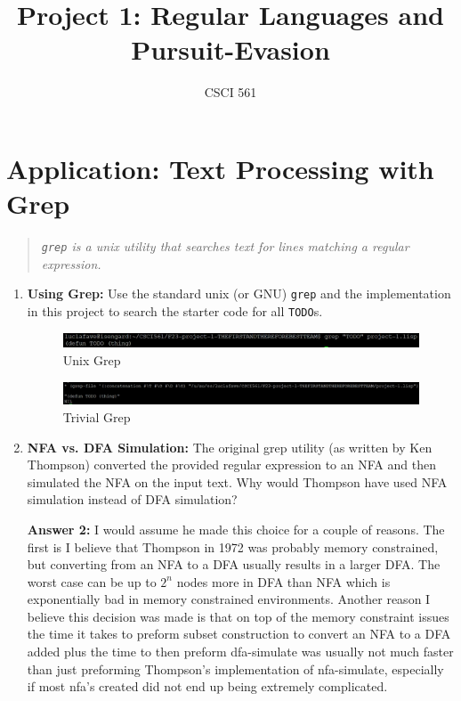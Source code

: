 \documentclass[12pt,letterpaper]{ntdhw}
\title{Project 1: Regular Languages and Pursuit-Evasion}
\author{CSCI 561}
\begin{document}
\pagestyle{fancyplain}

\maketitle
\thispagestyle{fancyplain}



\section*{Application: Text Processing with Grep}

\begin{quote}
  \emph{\texttt{grep} is a unix utility that searches text for lines
    matching a regular expression.}
\end{quote}

\begin{enumerate}
  \item \textbf{Using Grep:} Use the standard unix (or GNU)
  \texttt{grep} and the implementation in this project to search the
  starter code for all \texttt{TODO}s.
  \begin{figure}[htp]
    \centering
    \includegraphics[width=17cm]{unixGrep.JPG}
    \caption{Unix Grep}
  \end{figure}
  \begin{figure}[htp]
    \centering
    \includegraphics[width=17cm]{trivialgrep.jpg}
    \caption{Trivial Grep}
  \end{figure}
  

  \item \textbf{NFA vs. DFA Simulation:} The original grep utility (as
  written by Ken Thompson) converted the provided regular expression
  to an NFA and then simulated the NFA on the input text.  Why would
  Thompson have used NFA simulation instead of DFA simulation?
  \par \textbf{Answer 2:} I would assume he made this choice for a couple of reasons. The first is I believe that Thompson in 1972 was probably memory constrained, but converting from an NFA to a DFA usually results in a larger DFA. The worst case can be up to $2^n$ nodes more in DFA than NFA  which is exponentially bad in memory constrained environments. Another reason I believe this decision was made is that on top of the memory constraint issues the time it takes to preform subset construction to convert an NFA to a DFA added plus the time to then preform dfa-simulate was usually not much faster than just preforming Thompson's implementation of  nfa-simulate, especially if most nfa's created did not end up being extremely complicated. 


\end{enumerate}
\end{document}
